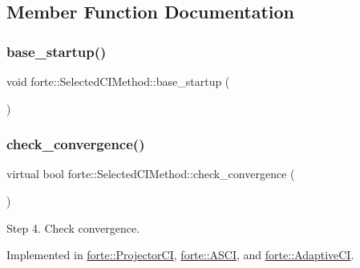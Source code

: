 \subsection{Member Function Documentation}
\mbox{\label{classforte_1_1_selected_c_i_method_ad7d8f31d3808dd907c3a593f6b1b58df}} 
\subsubsection{\texorpdfstring{base\+\_\+startup()}{base\_startup()}}
{\footnotesize\ttfamily void forte\+::\+Selected\+C\+I\+Method\+::base\+\_\+startup (\begin{DoxyParamCaption}{ }\end{DoxyParamCaption})}

\mbox{\label{classforte_1_1_selected_c_i_method_acc10aa488c79c2abec46a9093ecf5a52}} 
\subsubsection{\texorpdfstring{check\+\_\+convergence()}{check\_convergence()}}
{\footnotesize\ttfamily virtual bool forte\+::\+Selected\+C\+I\+Method\+::check\+\_\+convergence (\begin{DoxyParamCaption}{ }\end{DoxyParamCaption})\hspace{0.3cm}{\ttfamily [pure virtual]}}



Step 4. Check convergence. 



Implemented in \mbox{\hyperlink{classforte_1_1_projector_c_i_a92835e4b67f74340959ef8c4503ce241}{forte\+::\+Projector\+CI}}, \mbox{\hyperlink{classforte_1_1_a_s_c_i_a933b12da75f3baa3a824839f7a3f760b}{forte\+::\+A\+S\+CI}}, and \mbox{\hyperlink{classforte_1_1_adaptive_c_i_a2682a80aa48f7cd49c295efb826f30ca}{forte\+::\+Adaptive\+CI}}.

